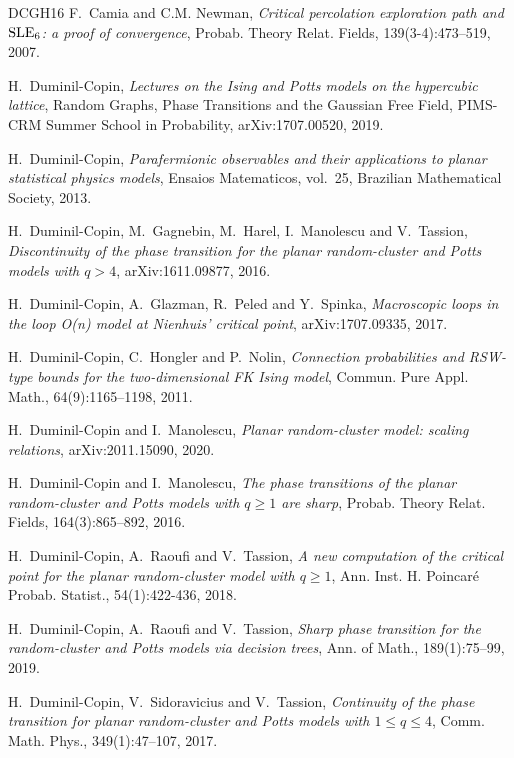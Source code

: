 \documentclass[a4paper,oneside,11pt]{article}
\numberwithin{equation}{section}
\numberwithin{equation}{section}
\numberwithin{equation}{section}
\begin{document}
\begin{thebibliography}{DCGH{\etalchar{+}}16}
F.~Camia and C.M. Newman, 
\emph{Critical percolation exploration path and {${\rm SLE}_6$}: a proof of convergence}, 
Probab. Theory Relat. Fields, 139(3-4):473--519, 2007.

H.~Duminil-Copin, 
\emph{Lectures on the {I}sing and {P}otts models on the hypercubic lattice}, 
Random Graphs, Phase Transitions and the Gaussian Free Field, PIMS-CRM Summer School in Probability, arXiv:1707.00520, 2019.

H.~Duminil-Copin, 
\emph{Parafermionic observables and their applications to planar statistical physics models}, 
Ensaios Matematicos, vol.~25, Brazilian Mathematical Society, 2013.

H.~Duminil-Copin, M.~Gagnebin, M.~Harel, I.~Manolescu and V.~Tassion,
\emph{Discontinuity of the phase transition for the planar random-cluster and {P}otts models with $q >4$}, 
arXiv:1611.09877, 2016.

H.~Duminil-Copin, A.~Glazman, R.~Peled and Y.~Spinka, 
\emph{Macroscopic loops in the loop O(n) model at Nienhuis' critical point},  
arXiv:1707.09335, 2017.

H.~{Duminil-Copin}, C.~Hongler and P.~Nolin,
{\em Connection probabilities and {RSW}-type bounds for the two-dimensional {FK} {I}sing model},
Commun. Pure Appl. Math., 64(9):1165--1198, 2011.

H.~Duminil-Copin and I.~Manolescu, 
\emph{Planar random-cluster model: scaling relations}, 
arXiv:2011.15090, 2020.

H.~Duminil-Copin and I.~Manolescu, 
\emph{The phase transitions of the planar random-cluster and {P}otts models with $q \geq 1$ are sharp}, 
Probab. Theory Relat. Fields, 164(3):865--892, 2016.

H.~Duminil-Copin, A.~Raoufi and V.~Tassion, 
\emph{A new computation of the critical point for the planar random-cluster model with $ q \ge1$}, 
Ann. Inst. H. Poincar\'e Probab. Statist., 54(1):422-436, 2018.

H.~Duminil-Copin, A.~Raoufi and V.~Tassion, 
\emph{Sharp phase transition for the random-cluster and {P}otts models via decision trees}, 
Ann. of Math., 189(1):75--99, 2019.

H.~Duminil-Copin, V.~Sidoravicius and V.~Tassion,
\emph{Continuity of the phase transition for planar random-cluster and Potts models with $1\leq q\leq 4$}, 
Comm. Math. Phys., 349(1):47--107, 2017. 


\end{thebibliography}
\end{document}
